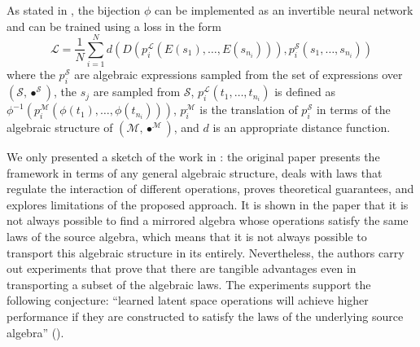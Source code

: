 \documentclass[11pt,a4paper,openright,twoside]{report}
\theoremstyle{plain}
\theoremstyle{definition}
\newcommand\dblquote[1]{\textquotedblleft #1\textquotedblright}
\begin{document}
As stated in \cite{pfrommer2024transport}, the bijection $\phi$ can be implemented as an invertible neural network and can be trained using a loss in the form
\[\mathcal{L} = \frac{1}{N}\sum_{i=1}^N d(D(p_i^{\mathcal{L}}(E(s_1),\dots,E(s_{n_i}))),p_i^{\mathcal{S}}(s_1, \dots, s_{n_i}))\]
where the $p_i^{\mathcal{S}}$ are algebraic expressions sampled from the set of expressions over $(\mathcal{S},\bullet^{\mathcal{S}})$, the $s_j$ are sampled from $\mathcal{S}$, $p_i^{\mathcal{L}}(t_1,\dots,t_{n_i})$ is defined as $\phi^{-1}(p_i^{\mathcal{M}}(\phi(t_1),\dots,\phi(t_{n_i})))$, $p_i^{\mathcal{M}}$ is the translation of $p_i^{\mathcal{S}}$ in terms of the algebraic structure of $(\mathcal{M},\bullet^{\mathcal{M}})$, and $d$ is an appropriate distance function.


We only presented a sketch of the work in \cite{pfrommer2024transport}: the original paper presents the framework in terms of any general algebraic structure, deals with laws that regulate the interaction of different operations, proves theoretical guarantees, and explores limitations of the proposed approach. It is shown in the paper that it is not always possible to find a mirrored algebra whose operations satisfy the same laws of the source algebra, which means that it is not always possible to transport this algebraic structure in its entirely. Nevertheless, the authors carry out experiments that prove that there are tangible advantages even in transporting a subset of the algebraic laws. The experiments support the following conjecture: \dblquote{learned latent space operations will achieve higher performance if they are constructed to satisfy the laws of the underlying source algebra} (\cite{pfrommer2024transport}). 
\end{document}
